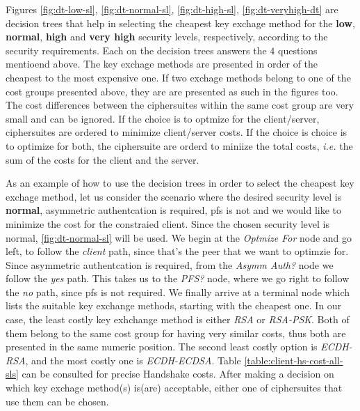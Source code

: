 \documentclass{llncs}
\begin{document}
Figures \ref{fig:dt-low-sl}, \ref{fig:dt-normal-sl}, \ref{fig:dt-high-sl}, \ref{fig:dt-veryhigh-dt} are decision trees that
help in selecting the cheapest key exchage method for the \textbf{low}, \textbf{normal}, \textbf{high} and \textbf{very high}
security levels, respectively, according to the security requirements. Each on the decision trees answers the $4$ questions
mentioend above. The key exchage methods are presented in order of the cheapest to the most expensive one. If two exchage methods
belong to one of the cost groups presented above, they are are presented as such in the figures too. The cost differences between 
the ciphersuites within the same cost group are very small and can be ignored. If the choice is to optmize for the client/server,
ciphersuites are ordered to minimize client/server costs. If the choice is choice is to optimize for both, the
ciphersuite are orderd to miniize the total costs, \textit{i.e.} the sum of the costs for the client and the server.

As an example of how to use the decision trees in order to select the cheapest key exchage method, let us consider the scenario
where the desired security level is \textbf{normal}, asymmetric authentcation is required, \gls{pfs} is not and we would like to
minimize the cost for the constraied client. Since the chosen security level is normal, \ref{fig:dt-normal-sl} will be used.
We begin at the \textit{Optmize For} node and go left, to follow the \textit{client} path, since that's the peer that we
want to optimzie for. Since asymmetric authentcation is required, from the \textit{Asymm Auth?} node we follow the \textit{yes}
path. This takes us to the \textit{PFS?} node, where we go right to follow the \textit{no} path, since \gls{pfs} is not required.
We finally arrive at a terminal node which lists the suitable key exchange methods, starting with the cheapest one.
In our case, the least costly key exhchange method is either \textit{RSA} or \textit{RSA-PSK}. Both of them belong to the same
cost group for having very similar costs, thus both are presented in the same numeric position. The second least costly option 
is \textit{ECDH-RSA}, and the most costly one is \textit{ECDH-ECDSA}. Table \ref{table:client-hs-cost-all-sls} can be consulted for
precise Handshake costs. After making a decision on which key exchage method(s) is(are) acceptable, either one of ciphersuites that
use them can be chosen.
\end{document}
